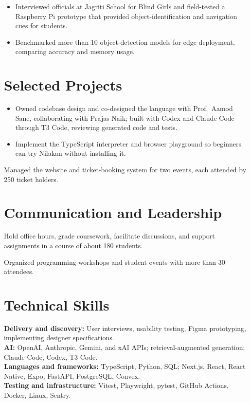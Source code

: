 \begin{itemize}
  \item Interviewed officials at Jagriti School for Blind Girls and field-tested a Raspberry Pi prototype that provided object-identification and navigation cues for students.
  \item Benchmarked more than 10 object-detection models for edge deployment, comparing accuracy and memory usage.
\end{itemize}
\section{Selected Projects}
\begin{itemize}
  \item Owned codebase design and co-designed the language with Prof.\ Aamod Sane, collaborating with Prajas Naik; built with Codex and Claude Code through T3 Code, reviewing generated code and tests.
  \item Implement the TypeScript interpreter and browser playground so beginners can try Nilakan without installing it.
\end{itemize}
Managed the website and ticket-booking system for two events, each attended by 250 ticket holders.\par
\section{Communication and Leadership}
Hold office hours, grade coursework, facilitate discussions, and support assignments in a course of about 180 students.\par
\vspace{3pt}
Organized programming workshops and student events with more than 30 attendees.
\section{Technical Skills}
\textbf{Delivery and discovery:} User interviews, usability testing, Figma prototyping, implementing designer specifications.\\
\textbf{AI:} OpenAI, Anthropic, Gemini, and xAI APIs; retrieval-augmented generation; Claude Code, Codex, T3 Code.\\
\textbf{Languages and frameworks:} TypeScript, Python, SQL; Next.js, React, React Native, Expo, FastAPI, PostgreSQL, Convex.\\
\textbf{Testing and infrastructure:} Vitest, Playwright, pytest, GitHub Actions, Docker, Linux, Sentry.

